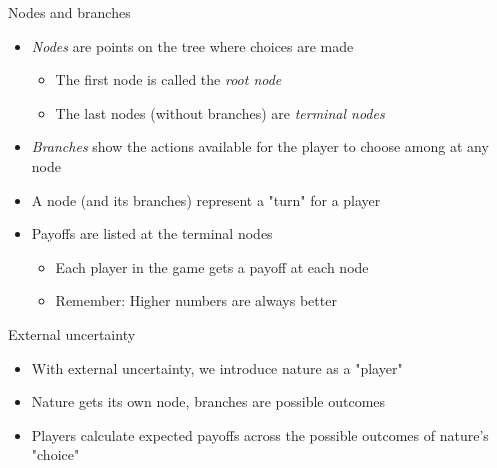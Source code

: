\documentclass[10pt]{beamer}
\begin{document}
\begin{frame}[label={sec:org4f5838a}]{}
\alert{Nodes and branches}
\begin{itemize}
\item \emph{Nodes} are points on the tree where choices are made
\begin{itemize}
\item The first node is called the \emph{root node}
\item The last nodes (without branches) are \emph{terminal nodes}
\end{itemize}
\item \emph{Branches} show the actions available for the player to choose among at any node
\item A node (and its branches) represent a "turn" for a player
\item Payoffs are listed at the terminal nodes
\begin{itemize}
\item Each player in the game gets a payoff at each node
\item Remember: Higher numbers are always better
\end{itemize}
\end{itemize}
\end{frame}

\begin{frame}[label={sec:org9ad0a92}]{}
\alert{External uncertainty}
\begin{itemize}
\item With external uncertainty, we introduce nature as a "player"
\item Nature gets its own node, branches are possible outcomes
\item Players calculate expected payoffs across the possible outcomes of nature's "choice"
\end{itemize}
\end{frame}
\end{document}
